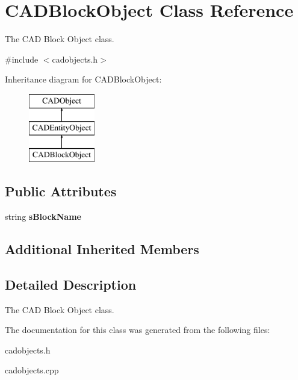 \hypertarget{class_c_a_d_block_object}{}\section{C\+A\+D\+Block\+Object Class Reference}
\label{class_c_a_d_block_object}


The C\+AD Block Object class.  




{\ttfamily \#include $<$cadobjects.\+h$>$}

Inheritance diagram for C\+A\+D\+Block\+Object\+:\begin{figure}[H]
\begin{center}
\leavevmode
\includegraphics[height=3.000000cm]{class_c_a_d_block_object}
\end{center}
\end{figure}
\subsection*{Public Attributes}
\begin{DoxyCompactItemize}
\item 
string {\bfseries s\+Block\+Name}\hypertarget{class_c_a_d_block_object_a91f8c26aaf0a65b4a26284ae82d630f6}{}\label{class_c_a_d_block_object_a91f8c26aaf0a65b4a26284ae82d630f6}

\end{DoxyCompactItemize}
\subsection*{Additional Inherited Members}


\subsection{Detailed Description}
The C\+AD Block Object class. 

The documentation for this class was generated from the following files\+:\begin{DoxyCompactItemize}
\item 
cadobjects.\+h\item 
cadobjects.\+cpp\end{DoxyCompactItemize}
